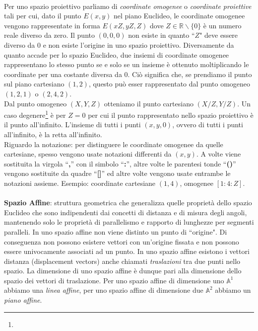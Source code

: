 \documentclass[a4paper,12pt]{tesiinfo}
\renewcommand{\footnotesize}{\fontsize{9pt}{11pt}\selectfont}
\begin{document}
\\
Per uno spazio proiettivo parliamo di \textit{coordinate omogenee} o \textit{coordinate proiettive} tali per cui, dato il punto $E(x, y)$ nel piano Euclideo, le coordinate omogenee vengono rappresentate in forma $E(xZ, yZ, Z)$ dove $Z \in \mathbb{R} \backslash \{0\}$ \`e un numero reale diverso da zero. Il punto $(0, 0, 0)$ non esiste in quanto ``$Z$" deve essere diverso da $0$ e non esiste l'origine in uno spazio proiettivo. Diversamente da quanto accade per lo spazio Euclideo, due insiemi di coordinate omogenee rappresentano lo stesso punto se e solo se un insieme \`e ottenuto moltiplicando le coordinate per una costante diversa da 0. Ci\`o significa che, se prendiamo il punto sul piano cartesiano $(1, 2)$, questo pu\`o esser rappresentato dal punto omogeneo $(1, 2, 1)$ o $(2, 4, 2)$.\\
Dal punto omogeneo $(X, Y, Z)$ otteniamo il punto cartesiano $(X/Z, Y/Z)$. Un caso degenere\footnote{\footnotesize{Enti/operazioni che pur rientrando sotto una data definizione (o in una data classe) presentano delle particolarit\`a che li differenziano dall'elemento generico della classe stessa, ad esempio: conica degenere, costituita da due rette; quadrica degenere, dotata di punti doppi (cono, cilindro, ecc.)}} \`e per $Z=0$ per cui il punto rappresentato nello spazio proiettivo \`e il punto all'infinito. L'insieme di tutti i punti $(x, y, 0)$, ovvero di tutti i punti all'infinito, \`e la retta all'infinito.
\\
Riguardo la notazione: per distinguere le coordinate omogenee da quelle cartesiane, spesso vengono usate notazioni differenti da $(x, y)$. A volte viene sostituita la virgola ``\textbf{,}'' con il simbolo ``\textbf{:}'', altre volte le parentesi tonde ``\textbf{()}'' vengono sostituite da quadre ``\textbf{[]}'' ed altre volte vengono usate entrambe le notazioni assieme. Esempio: coordinate cartesiane $(1, 4)$, omogenee $[1:4:Z]$.
\\\\
%
%
%
\textbf{Spazio Affine}: struttura geometrica che generalizza quelle propriet\`a dello spazio Euclideo che sono indipendenti dai concetti di distanza e di misura degli angoli, mantenendo solo le propriet\`a di parallelismo e rapporto di lunghezze per segmenti paralleli. In uno spazio affine non viene distinto un punto di ``origine". Di conseguenza non possono esistere vettori con un'origine fissata e non possono essere univocamente associati ad un punto. In uno spazio affine esistono i vettori distanza (displacement vectors) anche chiamati \textit{traslazioni} tra due punti nello spazio. La dimensione di uno spazio affine \`e dunque pari alla dimensione dello spazio dei vettori di traslazione. Per uno spazio affine di dimensione uno $\mathbb{A}^1$ abbiamo una \textit{linea affine}, per uno spazio affine di dimensione due $\mathbb{A}^2$ abbiamo un \textit{piano affine}.
\end{document}
